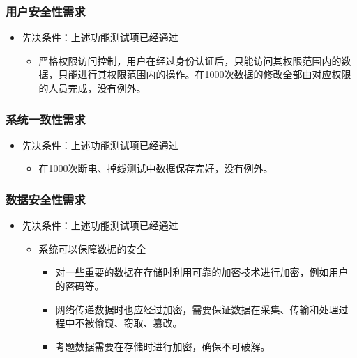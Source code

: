 \documentclass[hyperref, a4paper]{ctexart}
\providecommand{\tightlist}{%
  \setlength{\itemsep}{0pt}\setlength{\parskip}{0pt}}
\begin{document}
\hypertarget{ux7528ux6237ux5b89ux5168ux6027ux9700ux6c42}{%
\subsubsection{用户安全性需求}\label{ux7528ux6237ux5b89ux5168ux6027ux9700ux6c42}}

\begin{itemize}
\tightlist
\item
  先决条件：上述功能测试项已经通过

  \begin{itemize}
  \tightlist
  \item
    严格权限访问控制，用户在经过身份认证后，只能访问其权限范围内的数据，只能进行其权限范围内的操作。在1000次数据的修改全部由对应权限的人员完成，没有例外。
  \end{itemize}
\end{itemize}

\hypertarget{ux7cfbux7edfux4e00ux81f4ux6027ux9700ux6c42}{%
\subsubsection{系统一致性需求}\label{ux7cfbux7edfux4e00ux81f4ux6027ux9700ux6c42}}

\begin{itemize}
\tightlist
\item
  先决条件：上述功能测试项已经通过

  \begin{itemize}
  \tightlist
  \item
    在1000次断电、掉线测试中数据保存完好，没有例外。
  \end{itemize}
\end{itemize}

\hypertarget{ux6570ux636eux5b89ux5168ux6027ux9700ux6c42}{%
\subsubsection{数据安全性需求}\label{ux6570ux636eux5b89ux5168ux6027ux9700ux6c42}}

\begin{itemize}
\tightlist
\item
  先决条件：上述功能测试项已经通过

  \begin{itemize}
  \tightlist
  \item
    系统可以保障数据的安全

    \begin{itemize}
    \tightlist
    \item
      对一些重要的数据在存储时利用可靠的加密技术进行加密，例如用户的密码等。
    \item
      网络传递数据时也应经过加密，需要保证数据在采集、传输和处理过程中不被偷窥、窃取、篡改。
    \item
      考题数据需要在存储时进行加密，确保不可破解。
    \end{itemize}
  \end{itemize}
\end{itemize}
\end{document}
